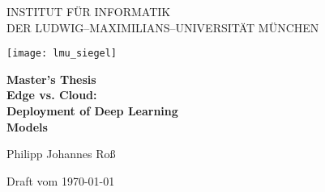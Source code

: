 
\thispagestyle{empty}

\begin{center}

\vspace*{-2cm}

{\Huge INSTITUT F\"UR INFORMATIK\\[1mm]}
DER LUDWIG--MAXIMILIANS--UNIVERSITÄT MÜNCHEN\\

\vspace*{1cm}

\texttt{[image: lmu\_siegel]}

\vspace*{2cm}

{\Large \textbf{Master's Thesis}}\\ %

\vspace{2.0cm}
{\Huge \textbf{Edge vs. Cloud:}}\\
\vspace*{2.5mm}
{\Huge \textbf{Deployment of Deep Learning}}\\
\vspace*{2mm}
{\Huge \textbf{Models}}\\
\vspace{1.5cm}

{\LARGE Philipp Johannes Roß} %

\vspace{3cm}
Draft vom \today %

\end{center}

\newpage


\thispagestyle{empty}
\cleardoublepage


\thispagestyle{empty}

